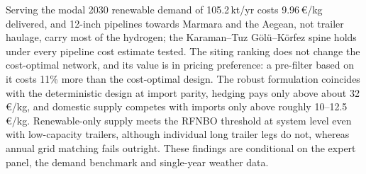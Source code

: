 \documentclass[preprint,12pt,authoryear]{elsarticle}
\begin{document}
Serving the modal 2030 renewable demand of 105.2\,kt/yr costs 9.96\,€/kg delivered, and 12-inch pipelines towards Marmara and the Aegean, not trailer haulage, carry most of the hydrogen; the Karaman--Tuz Gölü--Körfez spine holds under every pipeline cost estimate tested. The siting ranking does not change the cost-optimal network, and its value is in pricing preference: a pre-filter based on it costs 11\% more than the cost-optimal design. The robust formulation coincides with the deterministic design at import parity, hedging pays only above about 32\,€/kg, and domestic supply competes with imports only above roughly 10--12.5\,€/kg. Renewable-only supply meets the RFNBO threshold at system level even with low-capacity trailers, although individual long trailer legs do not, whereas annual grid matching fails outright. These findings are conditional on the expert panel, the demand benchmark and single-year weather data.
\end{document}
